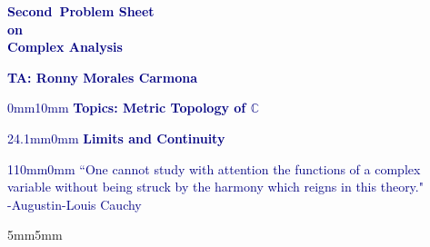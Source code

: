 \documentclass[11pt]{report} %
\newcommand{\card}{Second} %
\newcommand{\course}{Complex Analysis} %
\newcommand{\phrase}{One cannot study with attention the functions of a complex variable without being struck by the harmony which reigns in this theory.} %
\newcommand{\authorp}{Augustin-Louis Cauchy} %
\begin{document}
\setlength{\paperwidth}{595pt} %
\setlength{\paperheight}{841pt} %
\textcolor{navy}{\begin{flushright}
    {\Huge \textbf{\card\ Problem Sheet}}\\ [5pt]
    {\LARGE \textbf{on}}\\ [5pt]
    {\LARGE \textbf{\course}}\\ [30pt]
\end{flushright}
    {\LARGE \textbf{TA: Ronny Morales Carmona}} \vspace{-2pt}
\begin{adjustwidth}{0mm}{10mm}
    {\LARGE \textbf{Topics: Metric Topology of $\mathbb{C}$}}
\end{adjustwidth} \vspace{-4pt}
\begin{adjustwidth}{24.1mm}{0mm}
    {\LARGE \textbf{Limits and Continuity}}
\end{adjustwidth}
\begin{adjustwidth}{110mm}{0mm}
        \textsf{\large “\phrase"\\ [2pt]
                       -\authorp}
    \end{adjustwidth}}

\vspace{10pt}
\begin{adjustwidth}{5mm}{5mm} \fontsize{11pt}{0pt}





\end{adjustwidth}
\end{document}
